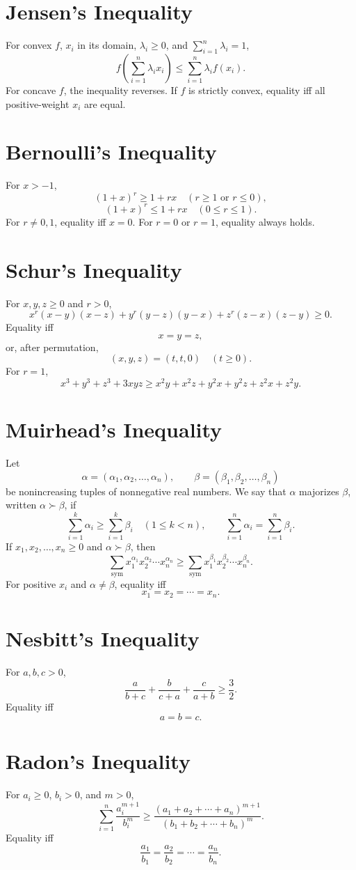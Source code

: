 \documentclass[11pt]{article}
\begin{document}
\section*{Jensen's Inequality}
For convex $f$, $x_i$ in its domain, $\lambda_i\geq 0$, and $\sum_{i=1}^n\lambda_i=1$,
\[
    f\left(\sum_{i=1}^n \lambda_ix_i\right)
    \leq
    \sum_{i=1}^n \lambda_if(x_i).
\]
For concave $f$, the inequality reverses. If $f$ is strictly convex, equality iff all positive-weight $x_i$ are equal.

\section*{Bernoulli's Inequality}
For $x>-1$,
\[
    (1+x)^r\geq 1+rx
    \quad (r\geq 1 \text{ or } r\leq 0),
\]
\[
    (1+x)^r\leq 1+rx
    \quad (0\leq r\leq 1).
\]
For $r\neq 0,1$, equality iff $x=0$. For $r=0$ or $r=1$, equality always holds.

\section*{Schur's Inequality}
For $x,y,z\geq 0$ and $r>0$,
\[
    x^r(x-y)(x-z)+y^r(y-z)(y-x)+z^r(z-x)(z-y)\geq 0.
\]
Equality iff
\[
    x=y=z,
\]
or, after permutation,
\[
    (x,y,z)=(t,t,0) \quad (t\geq 0).
\]
For $r=1$,
\[
    x^3+y^3+z^3+3xyz
    \geq
    x^2y+x^2z+y^2x+y^2z+z^2x+z^2y.
\]

\section*{Muirhead's Inequality}
Let
\[
    \alpha=(\alpha_1,\alpha_2,\ldots,\alpha_n),
    \qquad
    \beta=(\beta_1,\beta_2,\ldots,\beta_n)
\]
be nonincreasing tuples of nonnegative real numbers. We say that $\alpha$ majorizes $\beta$, written $\alpha\succ\beta$, if
\[
    \sum_{i=1}^k\alpha_i\geq\sum_{i=1}^k\beta_i
    \quad (1\leq k<n),
    \qquad
    \sum_{i=1}^n\alpha_i=\sum_{i=1}^n\beta_i.
\]
If $x_1,x_2,\ldots,x_n\geq 0$ and $\alpha\succ\beta$, then
\[
    \sum_{\mathrm{sym}}x_1^{\alpha_1}x_2^{\alpha_2}\cdots x_n^{\alpha_n}
    \geq
    \sum_{\mathrm{sym}}x_1^{\beta_1}x_2^{\beta_2}\cdots x_n^{\beta_n}.
\]
For positive $x_i$ and $\alpha\neq\beta$, equality iff
\[
    x_1=x_2=\cdots=x_n.
\]

\section*{Nesbitt's Inequality}
For $a,b,c>0$,
\[
    \frac{a}{b+c}+\frac{b}{c+a}+\frac{c}{a+b}\geq \frac{3}{2}.
\]
Equality iff
\[
    a=b=c.
\]

\section*{Radon's Inequality}
For $a_i\geq 0$, $b_i>0$, and $m>0$,
\[
    \sum_{i=1}^n \frac{a_i^{m+1}}{b_i^m}
    \geq
    \frac{(a_1+a_2+\cdots+a_n)^{m+1}}{(b_1+b_2+\cdots+b_n)^m}.
\]
Equality iff
\[
    \frac{a_1}{b_1}=\frac{a_2}{b_2}=\cdots=\frac{a_n}{b_n}.
\]
\end{document}
